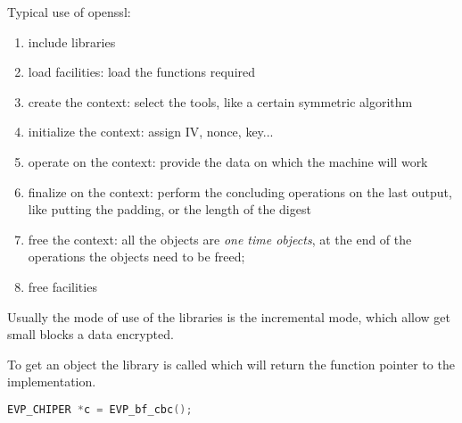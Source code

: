 \documentclass[12pt]{article}
\begin{document}
Typical use of openssl:
\begin{enumerate}
  \item include libraries
  \item load facilities: load the functions required
  \item create the context: select the tools, like a certain symmetric algorithm
  \item initialize the context: assign IV, nonce, key...
  \item operate on the context: provide the data on which the machine will work
  \item finalize on the context: perform the concluding operations on the last output, like putting the padding, or the length of the digest
  \item free the context: all the objects are \emph{one time objects}, at the end of the operations the objects need to be freed;
  \item free facilities
\end{enumerate}
Usually the mode of use of the libraries is the incremental mode, which allow get small blocks a data encrypted.

To get an object the library is called which will return the function pointer to the implementation.
\begin{lstlisting}[language=c]
EVP_CHIPER *c = EVP_bf_cbc();
\end{lstlisting}
\end{document}

